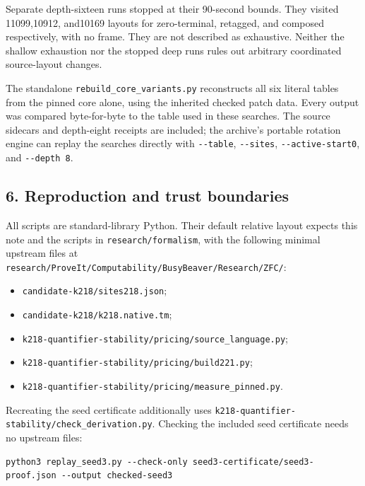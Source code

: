 \documentclass[
  11pt,
]{article}
\providecommand{\tightlist}{%
  \setlength{\itemsep}{0pt}\setlength{\parskip}{0pt}}
\begin{document}
Separate depth-sixteen runs stopped at their 90-second bounds. They
visited 11099,10912, and10169 layouts for zero-terminal, retagged, and
composed respectively, with no frame. They are not described as
exhaustive. Neither the shallow exhaustion nor the stopped deep runs
rules out arbitrary coordinated source-layout changes.

The standalone \texttt{rebuild\_core\_variants.py} reconstructs all six
literal tables from the pinned core alone, using the inherited checked
patch data. Every output was compared byte-for-byte to the table used in
these searches. The source sidecars and depth-eight receipts are
included; the archive's portable rotation engine can replay the searches
directly with \texttt{-\/-table}, \texttt{-\/-sites},
\texttt{-\/-active-start0}, and \texttt{-\/-depth\ 8}.

\hypertarget{reproduction-and-trust-boundaries}{%
\subsection{6. Reproduction and trust
boundaries}\label{reproduction-and-trust-boundaries}}

All scripts are standard-library Python. Their default relative layout
expects this note and the scripts in \texttt{research/formalism}, with
the following minimal upstream files at
\texttt{research/ProveIt/Computability/BusyBeaver/Research/ZFC/}:

\begin{itemize}
\tightlist
\item
  \texttt{candidate-k218/sites218.json};
\item
  \texttt{candidate-k218/k218.native.tm};
\item
  \texttt{k218-quantifier-stability/pricing/source\_language.py};
\item
  \texttt{k218-quantifier-stability/pricing/build221.py};
\item
  \texttt{k218-quantifier-stability/pricing/measure\_pinned.py}.
\end{itemize}

Recreating the seed certificate additionally uses
\texttt{k218-quantifier-stability/check\_derivation.py}. Checking the
included seed certificate needs no upstream files:

\begin{verbatim}
python3 replay_seed3.py --check-only seed3-certificate/seed3-proof.json --output checked-seed3
\end{verbatim}
\end{document}
